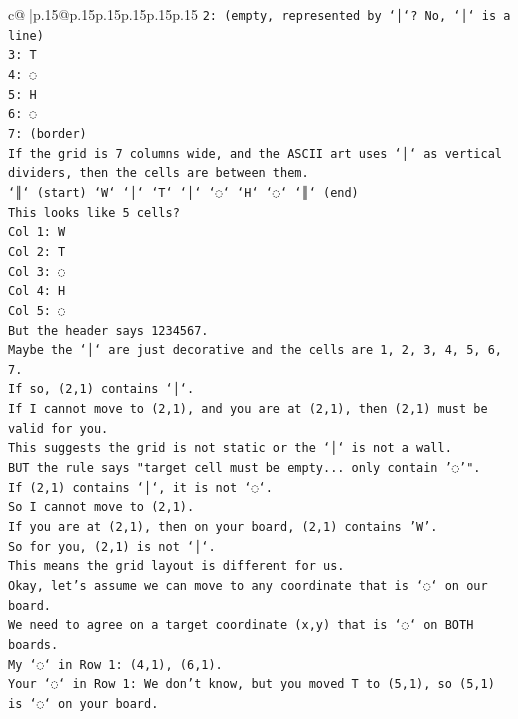 \documentclass{article}
\begin{document}
{\begin{supertabular}{c@{$\;$}|p{.15\linewidth}@{}p{.15\linewidth}p{.15\linewidth}p{.15\linewidth}p{.15\linewidth}p{.15\linewidth}}
{{{\texttt{2: (empty, represented by `│`? No, `│` is a line)} \\
\texttt{3: T} \\
\texttt{4: ◌} \\
\texttt{5: H} \\
\texttt{6: ◌} \\
\texttt{7: (border)} \\
\texttt{If the grid is 7 columns wide, and the ASCII art uses `│` as vertical dividers, then the cells are between them.} \\
\texttt{`║` (start) `W` `│` `T` `│` `◌` `H` `◌` `║` (end)} \\
\texttt{This looks like 5 cells?} \\
\texttt{Col 1: W} \\
\texttt{Col 2: T} \\
\texttt{Col 3: ◌} \\
\texttt{Col 4: H} \\
\texttt{Col 5: ◌} \\
\texttt{But the header says 1234567.} \\
\texttt{Maybe the `│` are just decorative and the cells are 1, 2, 3, 4, 5, 6, 7.} \\
\texttt{If so, (2,1) contains `│`.} \\
\texttt{If I cannot move to (2,1), and you are at (2,1), then (2,1) must be valid for you.} \\
\texttt{This suggests the grid is not static or the `│` is not a wall.} \\
\texttt{BUT the rule says "target cell must be empty... only contain '◌'".} \\
\texttt{If (2,1) contains `│`, it is not `◌`.} \\
\texttt{So I cannot move to (2,1).} \\
\texttt{If you are at (2,1), then on your board, (2,1) contains 'W'.} \\
\texttt{So for you, (2,1) is not `│`.} \\
\texttt{This means the grid layout is different for us.} \\
\texttt{Okay, let's assume we can move to any coordinate that is `◌` on our board.} \\
\texttt{We need to agree on a target coordinate (x,y) that is `◌` on BOTH boards.} \\
\texttt{My `◌` in Row 1: (4,1), (6,1).} \\
\texttt{Your `◌` in Row 1: We don't know, but you moved T to (5,1), so (5,1) is `◌` on your board.} \\
}}}
\end{supertabular}}
\end{document}
